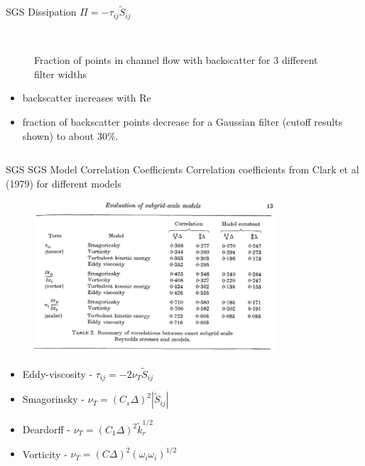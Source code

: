 \begin{frame}{SGS Dissipation $\Pi = -\tau_{ij}\widetilde{S}_{ij}$}
\begin{columns}
\begin{column}{.48\textwidth}
\begin{figure}
      ~\\\tiny{Fraction of points in channel flow with backscatter for 3 different filter widths}
      \end{figure}
      \begin{itemize}
     	\small
      	\item backscatter increases with Re
      	\item fraction of backscatter points decrease for a Gaussian filter (cutoff results shown) to about 30\%.
      \end{itemize}
    \end{column}
  \end{columns}
\end{frame}
\begin{frame}{SGS SGS Model Correlation Coefficients}
Correlation coefficients from Clark et al (1979) for different models    \begin{figure}
	\includegraphics[width=0.8\textwidth]{apriori13}
\end{figure}
\vspace{-10pt}
\begin{itemize}
\small
	\item Eddy-viscosity - $\tau_{ij} = -2\nu_T \widetilde{S}_{ij}$
	\item Smagorinsky - $\nu_T = (C_s \Delta)^2 |\widetilde{S}_{ij}|$
	\item Deardorff - $\nu_T = (C_1 \Delta)^2 \widetilde{k}_{r}^{1/2}$
	\item Vorticity - $\nu_T = (C\Delta)^2(\omega_i\omega_i)^{1/2}$
\end{itemize}
\end{frame}
